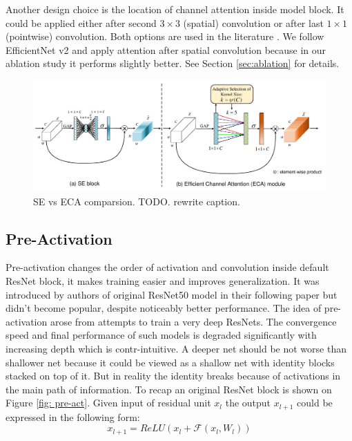 Another design choice is the location of channel attention inside model block. It could be applied either after second $3 \times 3$ (spatial) convolution or after last $1 \times 1 $ (pointwise) convolution. Both options are used in the literature \cite{tan2019_efficientnet} \cite{tan2021_efficientnetv2} \cite{lin2020neural_genet}. We follow EfficientNet v2 \cite{tan2021_efficientnetv2} and apply attention after spatial convolution because in our ablation study it performs slightly better.  See Section \ref{sec:ablation} for details. %


\begin{figure}[h!]
  \caption{SE vs ECA comparsion. TODO. rewrite caption.}
  \label{fig: se-eca}
  \includegraphics[width=1\textwidth]{images/eca_module.jpg}
\end{figure}


\subsection{Pre-Activation}
Pre-activation changes the order of activation and convolution inside default ResNet block, it makes training easier and improves generalization. It was introduced by authors of original ResNet50 model \cite{he2016deep_resnetv1} in their following paper \cite{he2016identity_resnetv2} but didn't become popular, despite noticeably better performance. 
The idea of pre-activation arose from attempts to train a very deep ResNets. The convergence speed and final performance of such models is degraded significantly with increasing depth which is contr-intuitive. A deeper net should be not worse than shallower net because it could be viewed as a shallow net with identity blocks stacked on top of it. But in reality the identity breaks because of activations in the main path of information. To recap an original ResNet block is shown on Figure \ref{fig: pre-act}. Given input of residual unit $x_l$ the output $x_{l+1}$ could be expressed in the following form: 
$$ x_{l+1} = ReLU \left( x_l + \mathcal{F} (x_l, W_l) \right)$$ \label{eq: res-block}

